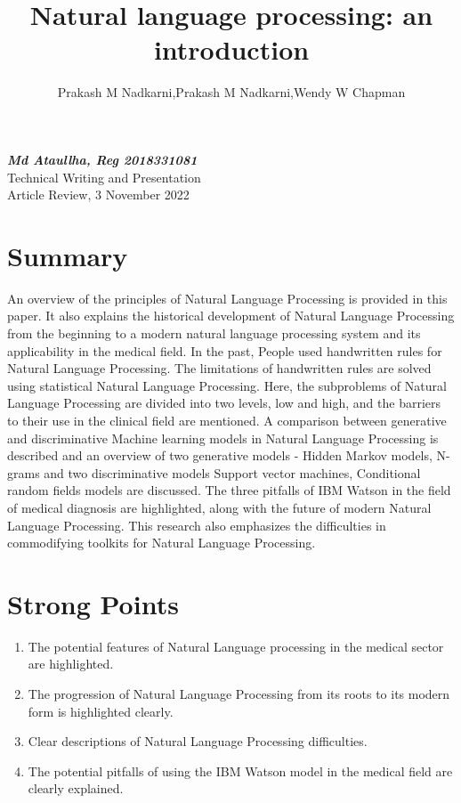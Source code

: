\documentclass[a4paper,12pt]{article}
\begin{document}
\begin{flushleft}
\textsl{\textbf{Md Ataullha, Reg 2018331081}}\\
Technical Writing and Presentation\\
Article Review, 3 November 2022
\end{flushleft}

\date{}
\title{Natural language processing: an introduction}
\author{Prakash M Nadkarni,Prakash M Nadkarni,Wendy W Chapman}
{\let\newpage\relax\maketitle} %
\maketitle


\section*{Summary}
An overview of the principles of Natural Language Processing is provided in this paper. It also explains the historical development of Natural Language Processing from the beginning to a modern natural language processing system and its applicability in the medical field. In the past, People used handwritten rules for Natural Language Processing. The limitations of handwritten rules are solved using statistical Natural Language Processing. Here, the subproblems of Natural Language Processing are divided into two levels, low and high, and the barriers to their use in the clinical field are mentioned. A comparison between generative and discriminative Machine learning models in Natural Language Processing is described and an overview of two generative models - Hidden Markov models, N-grams and two discriminative models Support vector machines, Conditional random fields models are discussed. The three pitfalls of IBM Watson in the field of medical diagnosis are highlighted, along with the future of modern Natural Language Processing. This research also emphasizes the difficulties in commodifying toolkits for Natural Language Processing.

\section*{Strong Points}

\begin{enumerate}
\item The potential features of Natural Language processing in the medical sector are highlighted.
\item The progression of Natural Language Processing from its roots to its modern form is highlighted clearly.
\item Clear descriptions of Natural Language Processing difficulties.
\item The potential pitfalls of using the IBM Watson model in the medical field are clearly explained.
\end{enumerate}
\end{document}
